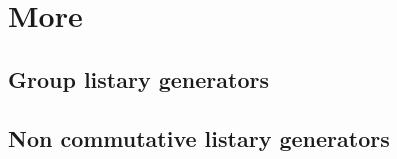 
\chapter{More}
\label{chap:annexe}

\section{Group listary generators}
\label{sec:group_list}



\section{Non commutative listary generators}
\label{sec:nc_list}



